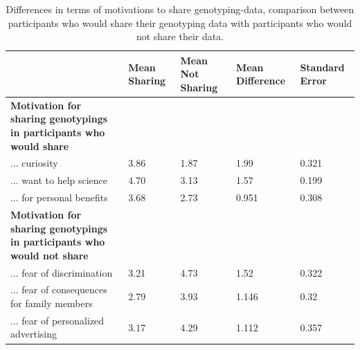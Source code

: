 \documentclass[10pt]{article}
\begin{document}
\begin{table}
\caption{Differences in terms of motivations to share genotyping-data, comparison between participants who would share their genotyping data with participants who would not share their data.}
\begin{tabular}{|p{7cm}|p{2cm}|p{2cm}|p{2cm}|p{2cm}|}
\hline
& Mean {Sharing} & Mean {Not Sharing} & Mean Difference & Standard Error \\ 
\hline
\textbf{Motivation for sharing genotypings in participants who would share} & & & & \\
\hline
... curiosity & 3.86 & 1.87 & 1.99 & 0.321 \\ \hline %
... want to help science & 4.70 & 3.13 & 1.57 & 0.199 \\ \hline %
... for personal benefits & 3.68 & 2.73 & 0.951 & 0.308 \\ \hline %
\textbf{Motivation for sharing genotypings in participants who would not share} & & & & \\
\hline
... fear of discrimination & 3.21 & 4.73 & 1.52 & 0.322 \\ \hline %
... fear of consequences for family members & 2.79 & 3.93 & 1.146 & 0.32 \\ \hline %
... fear of personalized advertising & 3.17 & 4.29 & 1.112 & 0.357 \\ \hline %
\end{tabular}
\label{tab:motivations2}
\end{table}
\end{document}

